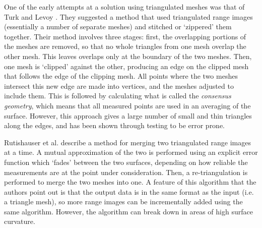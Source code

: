 \documentclass[10pt,oneside,fleqn,a4paper]{book}
\begin{document}
One of the early attempts at a solution using triangulated meshes was that of Turk and Levoy \cite{Turk94}. They suggested a method that used triangulated range images (essentially a number of separate meshes) and stitched or `zippered' them together. Their method involves three stages: first, the overlapping portions of the meshes are removed, so that no whole triangles from one mesh overlap the other mesh. This leaves overlaps only at the boundary of the two meshes. Then, one mesh is `clipped' against the other, producing an edge on the clipped mesh that follows the edge of the clipping mesh. All points where the two meshes intersect this new edge are made into vertices, and the meshes adjusted to include them. This is followed by calculating what is called the {\it consensus geometry}, which means that all measured points are used in an averaging of the surface. However, this approach gives a large number of small and thin triangles along the edges, and has been shown through testing to be error prone.

Rutishauser et al.\cite{Rutishauser94} describe a method for merging two triangulated range images at a time. A mutual approximation of the two is performed using an explicit error function which `fades' between the two surfaces, depending on how reliable the measurements are at the point under consideration. Then, a re-triangulation is performed to merge the two meshes into one. A feature of this algorithm that the authors point out is that the output data is in the same format as the input (i.e. a triangle mesh), so more range images can be incrementally added using the same algorithm. However, the algorithm can break down in areas of high surface curvature.
\end{document}
